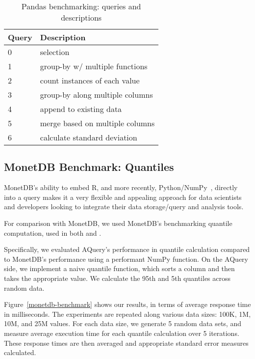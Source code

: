 \documentclass{acm_proc_article-sp}
\begin{document}
\begin{table}[]
\centering
\caption{Pandas benchmarking: queries and descriptions}
\label{pandas-benchmark-explanation}
\begin{tabular}{@{}ll@{}}
\toprule
Query & Description                     \\ \midrule
0     & selection                       \\
1     & group-by w/ multiple functions  \\
2     & count instances of each value   \\
3     & group-by along multiple columns \\
4     & append to existing data         \\
5     & merge based on multiple columns \\
6     & calculate standard deviation                               \\ \bottomrule
\end{tabular}
\end{table}



\subsection{MonetDB Benchmark: Quantiles}
MonetDB's ability to embed R\cite{monetdb-embedded-r}, and more recently, Python/NumPy~\cite{monetdb-embedded-python}, directly
into a query makes it a very flexible and appealing approach for data scientists and developers looking 
to integrate their data storage/query and analysis tools.

For comparison with MonetDB, we used MonetDB's benchmarking quantile computation, used in both
\cite{monetdb-embedded-r} and \cite{monetdb-embedded-python}.

Specifically, we evaluated AQuery's performance in quantile 
calculation compared to MonetDB's
performance using a performant NumPy function. On the AQuery side, we implement a 
naive quantile function, which sorts a column and then takes the appropriate value. We calculate the 95th and 5th quantiles across random data. 

Figure~\ref{monetdb-benchmark} shows our results, in terms of average response time in milliseconds.
The experiments are repeated along various data sizes: 100K, 1M, 10M, and 25M values. 
For each data size, we generate 5 random data sets, and measure average execution time for each quantile
calculation over 5 iterations. These response times are then averaged and appropriate standard error measures calculated.
\end{document}
